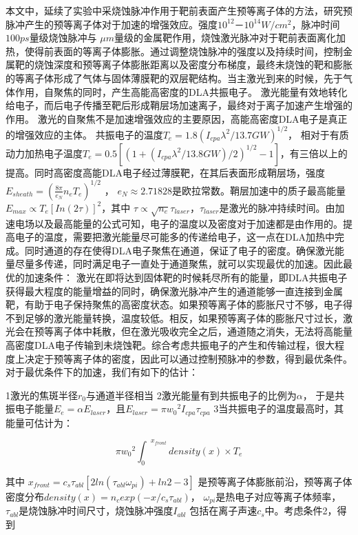 本文中，延续了实验中采烧蚀脉冲作用于靶前表面产生预等离子体的方法，研究预脉冲产生的预等离子体对于加速的增强效应。强度$10^{12}－10^{14} W/cm^2$，脉冲时间$100ps$量级烧蚀脉冲与
$\mu m$量级的金属靶作用，烧蚀激光脉冲对于靶前表面离化加热，使得前表面的等离子体膨胀。通过调整烧蚀脉冲的强度以及持续时间，控制金属靶的烧蚀深度和预等离子体膨胀距离以及密度分布梯度，最终未烧蚀的靶和膨胀的等离子体形成了气体与固体薄膜靶的双层靶结构。当主激光到来的时候，先于气体作用，自聚焦的同时，产生高能高密度的DLA共振电子。
激光能量有效地转化给电子，而后电子传播至靶后形成鞘层场加速离子，最终对于离子加速产生增强的作用。
激光的自聚焦不是加速增强效应的主要原因，高能高密度DLA电子是真正的增强效应的主体。
共振电子的温度$T_e=1.8(I_{cpa}{\lambda}^2/{13.7}GW)^{1/2}$\cite{pukhov1999particle}，
相对于有质动力加热电子温度$T_e=0.5[(1+(I_{cpa}{\lambda}^2/{13.8}GW)/2)^{1/2}-1]$\cite{wilks1992absorption}，有三倍以上的提高。同时高密度高能DLA电子经过薄膜靶，在其后表面形成鞘层场，强度$E_{sheath}= (\frac{8 \pi}{e_N} n_e T_e)^{1/2}$ \cite{mora2003plasma}， $e_N \approx 2.71828$是欧拉常数。鞘层加速中的质子最高能量$E_{max} \propto T_e[In(2\tau)]^2$，其中 $\tau \propto \sqrt{n_e} \tau_{laser}$，$\tau_{laser}$是激光的脉冲持续时间。由加速电场以及最高能量的公式可知，电子的温度以及密度对于加速都是由作用的。提高电子的温度，需要把激光能量尽可能多的传递给电子，这一点在DLA加热中完成。同时通道的存在使得DLA电子聚焦在通道，保证了电子的密度。确保激光能量尽量多传递，同时满足电子一直处于通道聚焦，就可以实现最优的加速。因此最优的加速条件：
激光在即将达到固体靶的时候耗尽所有的能量，即DLA共振电子获得最大程度的能量增益的同时，确保激光脉冲产生的通道能够一直连接到金属靶，有助于电子保持聚焦的高密度状态。如果预等离子体的膨胀尺寸不够，电子得不到足够的激光能量转换，温度较低。相反，如果预等离子体的膨胀尺寸过长，激光会在预等离子体中耗散，但在激光吸收完全之后，通道随之消失，无法将高能量高密度DLA电子传输到未烧蚀靶。综合考虑共振电子的产生和传输过程，很大程度上决定于预等离子体的密度，因此可以通过控制预脉冲的参数，得到最优条件。对于最优条件下的加速，我们有如下的估计：




1激光的焦斑半径$r_0$与通道半径相当
2激光能量有到共振电子的比例为$\alpha$， 于是共振电子能量$E_{e} =\alpha E_{laser} $，且$E_{laser}=\pi {w_0}^2 I_{cpa} \tau_{cpa}$
3当共振电子的温度最高时，其能量可估计为：

\begin{equation}
\label{eqn:energyOsilationElectron}
 \pi {w_0}^2 {{\int}_{0}}^{x_{front}} density(x) \times T_e
\end{equation}

其中 $x_{front}=c_s {\tau}_{abl}[2ln({\tau}_{abl} {\omega}_{pi})+ln2-3]$\cite{mora2003plasma}    是预等离子体膨胀前沿，预等离子体密度分布$density(x)=n_c exp(-x/{c_s{\tau}_{abl}})$， ${\omega}_{pi}$是热电子对应等离子体频率， ${\tau}_{abl}$是烧蚀脉冲时间尺寸，烧蚀脉冲强度$I_{abl}$ 包括在离子声速$c_s$中。考虑条件2，得到



